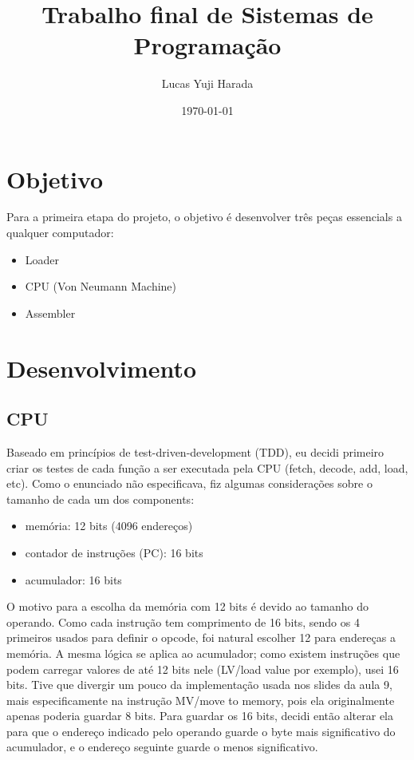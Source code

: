 \documentclass[11pt]{article}
\author{Lucas Yuji Harada}
\date{\today}
\title{Trabalho final de Sistemas de Programação}
\begin{document}
\maketitle
\tableofcontents


\section{Objetivo}
\label{sec:orge6ae37d}
Para a primeira etapa do projeto, o objetivo é desenvolver três peças essencials a qualquer computador:
\begin{itemize}
\item Loader
\item CPU (Von Neumann Machine)
\item Assembler
\end{itemize}

\section{Desenvolvimento}
\label{sec:org04bd6b2}
\subsection{CPU}
\label{sec:orgfc890f6}
Baseado em princípios de test-driven-development (TDD), eu decidi primeiro criar
os testes de cada função a ser executada pela CPU (fetch, decode, add, load,
etc). Como o enunciado não especificava, fiz algumas considerações sobre o tamanho de cada um dos components:
\begin{itemize}
\item memória: 12 bits (4096 endereços)
\item contador de instruções (PC): 16 bits
\item acumulador: 16 bits
\end{itemize}
O motivo para a escolha da memória com 12 bits é devido ao tamanho do operando.
Como cada instrução tem comprimento de 16 bits, sendo os 4 primeiros usados para
definir o opcode, foi natural escolher 12 para endereças a memória. A mesma
lógica se aplica ao acumulador; como existem instruções que podem carregar
valores de até 12 bits nele (LV/load value por exemplo), usei 16 bits. Tive que
divergir um pouco da implementação usada nos slides da aula 9, mais
especificamente na instrução MV/move to memory, pois ela originalmente apenas
poderia guardar 8 bits. Para guardar os 16 bits, decidi então alterar ela para
que o endereço indicado pelo operando guarde o byte mais significativo do
acumulador, e o endereço seguinte guarde o menos significativo.
\end{document}
